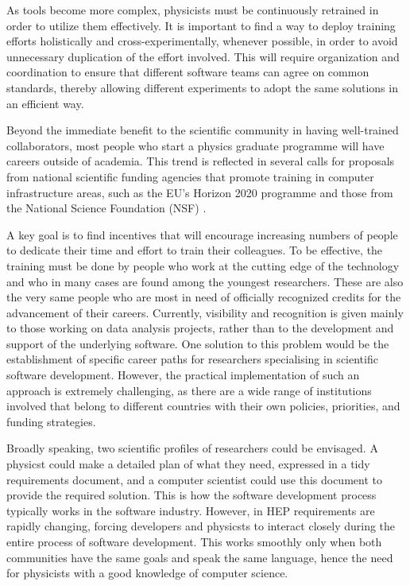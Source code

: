 \documentclass[12pt,a4paper]{article}
\begin{document}
As tools become more complex, physicists must be continuously retrained in order
to utilize them effectively. It is important to find a way to deploy training efforts
holistically and cross-experimentally, whenever possible, in order to avoid unnecessary
duplication of the effort involved. This will require organization and coordination to
ensure that different software teams can agree on common standards, thereby allowing different
experiments to adopt the same solutions in an efficient way.

Beyond the immediate benefit to the scientific community in having well-trained
collaborators, most people who start a physics graduate programme will have
careers outside of academia. This trend is reflected in several calls for
proposals from national scientific funding agencies that promote training in computer
infrastructure areas, such as the EU's Horizon 2020 programme and those from
the National Science Foundation (NSF) \cite{NSF1,NSF2}.

A key goal is to find incentives that will encourage
increasing numbers of people to dedicate their time and effort to train their
colleagues.
To be effective, the training must be done by people who work at the cutting
edge of the technology and who in many cases are found among the youngest
researchers. These are also the very same people who are most in need of
officially recognized credits for the advancement of their careers. Currently,
visibility and recognition is given mainly to those working on data analysis
projects, rather than to the development and support of the underlying
software. One solution to this problem would be the establishment of specific
career paths for researchers specialising in scientific software development.
However, the practical
implementation of such an approach is extremely challenging, as there are a wide range of
institutions involved that belong to different countries with their own
policies, priorities, and funding strategies.

Broadly speaking, two scientific profiles of researchers could be
envisaged. A physicst could make a detailed plan of what they need, expressed
in a tidy requirements document, and a computer scientist could use this document
to provide the required solution. This is how the software development process
typically works in the software industry. However, in HEP requirements are rapidly
changing, forcing developers and physicsts to interact closely during the entire
process of software development. This works smoothly only when both communities
have the same goals and speak the same language, hence the need for physicists with a good
knowledge of computer science.
\end{document}

